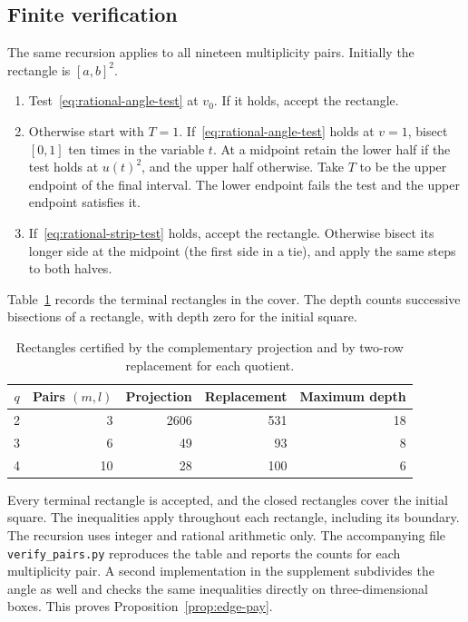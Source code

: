 \documentclass[11pt,a4paper]{article}
\theoremstyle{remark}\newtheorem{remark}[theorem]{Remark}
\numberwithin{equation}{section}
\begin{document}
\subsection{Finite verification}

The same recursion applies to all nineteen multiplicity pairs. Initially
the rectangle is \([a,b]^2\).
\begin{enumerate}
\item Test~\eqref{eq:rational-angle-test} at \(v_0\). If it holds, accept
the rectangle.
\item Otherwise start with \(T=1\). If~\eqref{eq:rational-angle-test}
holds at \(v=1\), bisect \([0,1]\) ten times in the variable \(t\).
At a midpoint retain the lower half if the test holds at \(u(t)^2\),
and the upper half otherwise. Take \(T\) to be the upper endpoint
of the final interval. The lower endpoint fails the test and the upper
endpoint satisfies it.
\item If~\eqref{eq:rational-strip-test} holds, accept the rectangle.
Otherwise bisect its longer side at the midpoint (the first side in a
tie), and apply the same steps to both halves.
\end{enumerate}
Table~\ref{tab:verification} records the terminal rectangles in the
cover. The depth counts successive bisections of a rectangle, with
depth zero for the initial square.
\begin{table}[htbp]
\centering
\caption{Rectangles certified by the complementary projection and by
two-row replacement for each quotient.}\label{tab:verification}
\smallskip
\begin{tabular}{crrrr}
\toprule
\(q\)&Pairs \((m,l)\)&Projection&Replacement&Maximum depth\\
\midrule
2&3&2606&531&18\\
3&6&49&93&8\\
4&10&28&100&6\\
\bottomrule
\end{tabular}
\end{table}
Every terminal rectangle is accepted, and the closed rectangles cover
the initial square. The inequalities apply throughout each rectangle,
including its boundary. The recursion uses integer and rational
arithmetic only. The accompanying file \texttt{verify\_pairs.py}
reproduces the table and reports the counts for each multiplicity
pair. A second implementation in the supplement subdivides the angle
as well and checks the same inequalities directly on three-dimensional
boxes. This proves Proposition~\ref{prop:edge-pay}.
\end{document}
